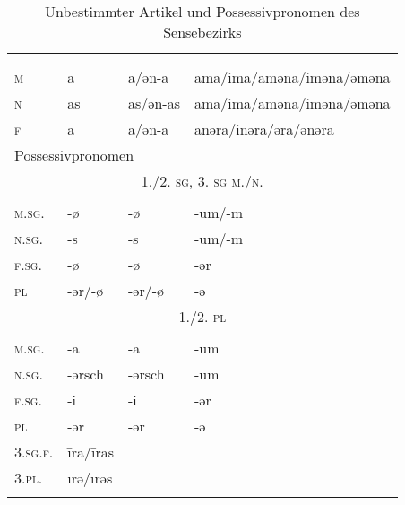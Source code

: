 \begin{table}[H]
	\caption{Unbestimmter Artikel und Possessivpronomen des Sensebezirks \citep[194, 198-199]{Henzen1927}}\label{table107}
	\begin{tabular}{llll}
		\lsptoprule
		\multicolumn{4}{l}{unbestimmter Artikel}\\
		& \NOM & \AKK & \DAT\\\midrule
		\textsc{m} & a & a/ən-a & ama/ima/aməna/iməna/əməna\\
		\textsc{n} & as & as/ən-as & ama/ima/aməna/iməna/əməna\\
		\textsc{f} & a & a/ən-a & anəra/inəra/əra/ənəra\\ \midrule
		\multicolumn{4}{l}{Possessivpronomen}\\
		\multicolumn{4}{c}{\scshape 1./2. \textsc{sg}, 3. \textsc{sg} m./n.} \\\cmidrule(lr){1-4}
		& \NOM & \AKK & \DAT\\\midrule
		\textsc{m.sg.} & {}-ø & {}-ø & {}-um/-m\\
		\textsc{n.sg.} & {}-s & {}-s & {}-um/-m\\
		\textsc{f.sg.} & {}-ø & {}-ø & {}-ər\\
		\textsc{pl} & {}-ər/-ø & {}-ər/-ø & {}-ə\\ \midrule
		\multicolumn{4}{c}{\scshape 1./2. \textsc{pl}}  \\\cmidrule(lr){1-4}
		& \NOM & \AKK & \DAT\\\midrule
		\textsc{m.sg.} & {}-a & {}-a & {}-um\\
		\textsc{n.sg.} & {}-ərsch & {}-ərsch & {}-um\\
		\textsc{f.sg.} & {}-i & {}-i & {}-ər\\
		\textsc{pl} & {}-ər & {}-ər & {}-ə\\
		\midrule
		\textsc{3.sg.f.} & \=ira/\=iras &  & \\
		\textsc{3.pl.} & \=irə/\=irəs &  & \\
		\lspbottomrule
	\end{tabular}
\end{table}


